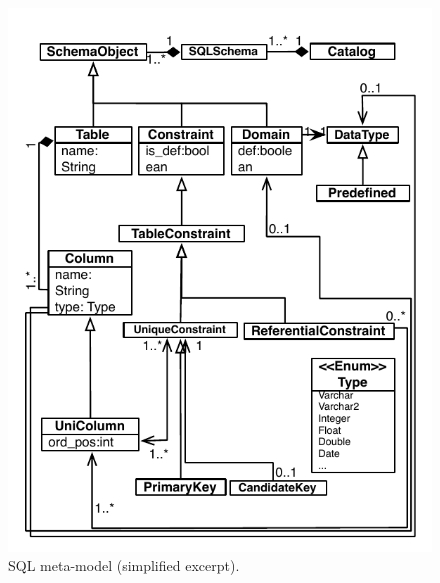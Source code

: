 \documentclass[a4paper,twoside]{article}
\begin{document}
\begin{figure}[!h]
\centering
  \includegraphics[scale=0.75]{figuras/SQL92Novo}
\caption{SQL meta-model (simplified excerpt).}
\label{fig:sql_metamodel}
\end{figure}
\end{document}
